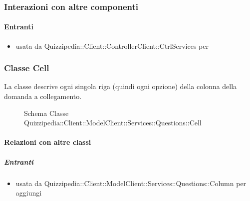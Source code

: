 \subsubsection{Interazioni con altre componenti}
\paragraph{Entranti}
\begin{itemize}
\item usata da Quizzipedia::Client::ControllerClient::CtrlServices per 
\end{itemize}
\subsubsection{Classe Cell}
La classe descrive ogni singola riga (quindi ogni opzione) della colonna della domanda a collegamento.
\begin{figure}[H]
\centering
\noindent{}
\caption[Schema Classe Cell]{Schema Classe Quizzipedia::Client::ModelClient::Services::Questions::Cell}
\end{figure}
\paragraph{Relazioni con altre classi}
\subparagraph{Entranti}
\begin{itemize}
\item usata da Quizzipedia::Client::ModelClient::Services::Questions::Column per aggiungi
\end{itemize}
